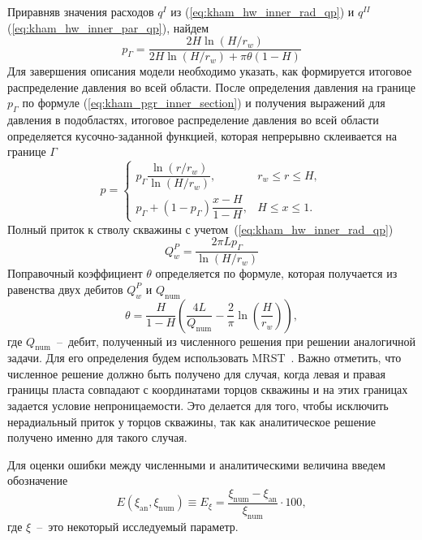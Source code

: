 \documentclass{article}
\begin{document}
Приравняв значения расходов $q^I$ из (\ref{eq:kham_hw_inner_rad_qp}) и $q^{II}$ (\ref{eq:kham_hw_inner_par_qp}), найдем
\begin{equation}
  \displaystyle
  p_{\Gamma} = \dfrac{2 H \ln{\left(H/r_w\right)}}{2 H \ln{\left(H/r_w\right) + \pi \theta \left(1 - H\right)}}
  \label{eq:kham_pgr_inner_section}
\end{equation}
Для завершения описания модели необходимо указать, как формируется итоговое распределение
давления во всей области. После определения давления на границе $p_{\Gamma}$ по формуле (\ref{eq:kham_pgr_inner_section}) и получения выражений для давления в подобластях, итоговое распределение давления во всей области определяется кусочно-заданной функцией, которая непрерывно склеивается на границе
$\Gamma$
\begin{equation}
  p =
  \begin{cases}
    p_{\Gamma} \dfrac{\ln{\left(r/r_w\right)}}{\ln{\left(H/r_w\right)}}, & r_w \leq r \leq H, \\
    p_{\Gamma} + (1 - p_{\Gamma})\dfrac{x - H}{1-H}, & H \leq x \leq 1.
  \end{cases}
  \label{eq:kham_hw_innerotal_pressure}
\end{equation}
Полный приток к стволу скважины с учетом~(\ref{eq:kham_hw_inner_rad_qp})
\begin{equation}
  \displaystyle
  Q_w^P = \dfrac{2\pi L p_{\Gamma}}{\ln{\left(H/r_w\right)}}
  \label{eq:kham_qw_inner}
\end{equation}
Поправочный коэффициент $\theta$ определяется по формуле, которая получается из равенства двух дебитов $Q_w^P$ и $Q_{\text{num}}$
\begin{equation}
  \displaystyle
  \theta = \dfrac{H}{1-H} \left(\dfrac{4L}{Q_{\text{num}}} - \dfrac{2}{\pi} \ln \left(\dfrac{H}{r_w}\right)\right),
  \label{eq:kham_theta_inner}
\end{equation}
где $Q_{\text{num}}$~--~дебит, полученный из численного решения при решении аналогичной задачи. Для его определения будем использовать MRST~\cite{lit:kham_mrst}. Важно отметить, что численное решение должно быть получено для случая, когда левая и правая границы пласта совпадают с координатами торцов скважины и на этих границах задается условие непроницаемости. Это делается для того, чтобы исключить нерадиальный приток у торцов скважины, так как аналитическое решение получено именно для такого случая.

Для оценки ошибки между численными и аналитическими величина введем обозначение
\begin{equation}
  \displaystyle
  E \left(\xi_{\text{an}}, \xi_{\text{num}}\right) \equiv E_{\xi} = \dfrac{\xi_{\text{num}} - \xi_{\text{an}}}{\xi_{\text{num}}} \cdot 100,
  \label{eq:kham_common_residual}
\end{equation}
где $\xi$~--~это некоторый исследуемый параметр.
\end{document}

